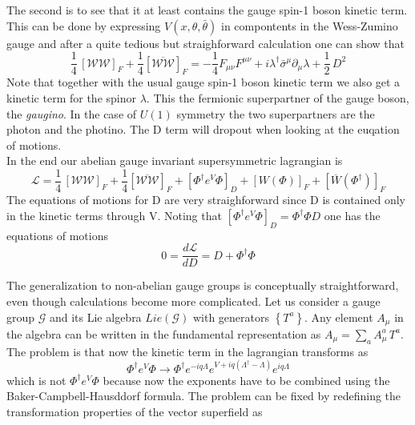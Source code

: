 \documentclass[12pt]{article}
\begin{document}
The second is to see that it at least contains the gauge spin-1 boson kinetic term. This can be done by expressing $V(x, \theta, \bar\theta)$ in compontents in the Wess-Zumino gauge and after a quite tedious but straighforward calculation one can show that 
\begin{equation*}
  \frac{1}{4} \, \left[\mathcal{W}\mathcal{W}\right]_F + \frac{1}{4} \left[\overline{\mathcal{W}\mathcal{W}}\right]_F = -\frac{1}{4} F_{\mu\nu}F^{\mu\nu} + i \lambda^\dagger \bar\sigma^\mu \partial_\mu \lambda + \frac{1}{2} \, D^2
\end{equation*}
Note that together with the usual gauge spin-1 boson kinetic term we also get a kinetic term for the spinor $\lambda$. This the fermionic superpartner of the gauge boson, the \emph{gaugino}. In the case of $U(1)$ symmetry the two superpartners are the photon and the photino.
The D term will dropout when looking at the euqation of motions. \\
In the end our abelian gauge invariant supersymmetric lagrangian is 
\begin{equation*}
  \mathcal{L} = \frac{1}{4} \, \left[\mathcal{W}\mathcal{W}\right]_F + \frac{1}{4} \left[\overline{\mathcal{W}\mathcal{W}}\right]_F + \left[\Phi^\dagger e^V \Phi\right]_D + [W(\Phi)]_F + [\overline{W} (\Phi^\dagger)]_F
\end{equation*}
The equations of motions for D are very straighforward since D is contained only in the kinetic terms through V. Noting that $[\Phi^\dagger e^V \Phi]_D = \Phi^\dagger \Phi D$ one has the equations of motions 
\begin{equation*}
  0 = \frac{d\mathcal{L}}{dD} = D + \Phi^\dagger \Phi
\end{equation*}
\par
\vspace{15pt}
The generalization to non-abelian gauge groups is conceptually straightforward, even though calculations become more complicated. Let us consider a gauge group $\mathcal{G}$ and its Lie algebra $Lie(\mathcal{G})$ with generators $\left\{T^a\right\}$.
Any element $A_\mu$ in the algebra can be written in the fundamental representation as $A_\mu = \sum_a A_\mu^a \, T^a$. The problem is that now the kinetic term in the lagrangian transforms as 
\begin{equation*}
  \Phi^\dagger e^V \Phi \to \Phi^\dagger e^{-iq\Lambda} e^{V + iq(\Lambda^\dagger - \Lambda)} e^{iq\Lambda}
\end{equation*}
which is not $\Phi^\dagger e^V \Phi$ because now the exponents have to be combined using the Baker-Campbell-Hausddorf formula. The problem can be fixed by redefining the transformation properties of the vector superfield as 
\end{document}
